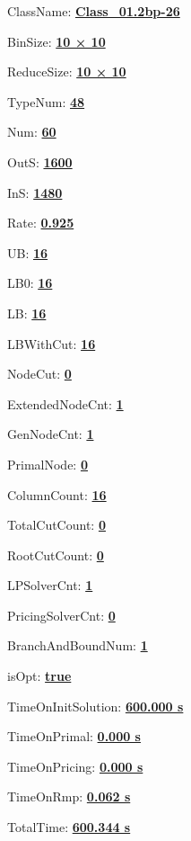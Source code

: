 \documentclass[11pt]{article}
\begin{document}
\pagestyle{empty}


ClassName: \underline{\textbf{Class_01.2bp-26}}
\par
BinSize: \underline{\textbf{10 × 10}}
\par
ReduceSize: \underline{\textbf{10 × 10}}
\par
TypeNum: \underline{\textbf{48}}
\par
Num: \underline{\textbf{60}}
\par
OutS: \underline{\textbf{1600}}
\par
InS: \underline{\textbf{1480}}
\par
Rate: \underline{\textbf{0.925}}
\par
UB: \underline{\textbf{16}}
\par
LB0: \underline{\textbf{16}}
\par
LB: \underline{\textbf{16}}
\par
LBWithCut: \underline{\textbf{16}}
\par
NodeCut: \underline{\textbf{0}}
\par
ExtendedNodeCnt: \underline{\textbf{1}}
\par
GenNodeCnt: \underline{\textbf{1}}
\par
PrimalNode: \underline{\textbf{0}}
\par
ColumnCount: \underline{\textbf{16}}
\par
TotalCutCount: \underline{\textbf{0}}
\par
RootCutCount: \underline{\textbf{0}}
\par
LPSolverCnt: \underline{\textbf{1}}
\par
PricingSolverCnt: \underline{\textbf{0}}
\par
BranchAndBoundNum: \underline{\textbf{1}}
\par
isOpt: \underline{\textbf{true}}
\par
TimeOnInitSolution: \underline{\textbf{600.000 s}}
\par
TimeOnPrimal: \underline{\textbf{0.000 s}}
\par
TimeOnPricing: \underline{\textbf{0.000 s}}
\par
TimeOnRmp: \underline{\textbf{0.062 s}}
\par
TotalTime: \underline{\textbf{600.344 s}}
\par
\newpage


\end{document}
